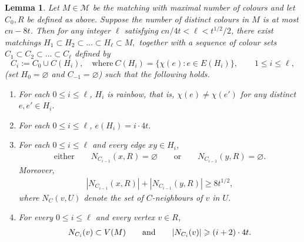 \documentclass[11pt,reqno]{amsart}
\newtheorem{lemma}[theorem]{Lemma}
\theoremstyle{definition}
\theoremstyle{remark}
\newcommand\cM{\mathcal{M}}
\renewcommand\leq{\leqslant}
\renewcommand\geq{\geqslant}
\renewcommand\le{\leqslant}
\renewcommand\ge{\geqslant}
\begin{document}
\begin{lemma}\label{lem:matchingkey}
Let $M \in \cM$ be the matching with maximal number of colours and let $C_0, R$ be defined as above. Suppose the number of distinct colours in $M$ is at most $cn - 8t$. Then for any integer $\ell$ satisfying $cn/4t < \ell < t^{1/2}/2$, there exist matchings
$H_1\subset H_2\subset...\subset H_\ell \subset M,$
together with a sequence of colour sets $C_1\subset C_2\subset...\subset C_\ell$ defined by
\[
C_i := C_0 \cup C(H_i), \quad \text{where}\ C(H_i)=\{\chi(e) : e \in E(H_i)\}, \qquad 1 \le i \le \ell,
\]
(set $H_0=\varnothing$ and $C_{-1}=\varnothing$) such that the following holds. 
\begin{enumerate}
\item[(i)] For each $0 \leq i\leq \ell$, $H_i$ is rainbow, that is,
$\chi(e)\neq\chi(e')$
for any distinct $e,e'\in H_i$.

\item[(ii)] For each $0 \le i \le \ell$, $e(H_i) = i\cdot 4t.$
 
\item[(iii)]  For each $0 \le i \le \ell$ and  every edge $xy\in H_i$, 
\begin{align}\label{eq:onesideempty}
\text{either}\qquad N_{C_{i-1}}(x,R)=\varnothing\qquad\text{or}\qquad N_{C_{i-1}}(y,R)=\varnothing.     
\end{align}
Moreover, 
\begin{align}\label{eq:degreesum}
|N_{C_{i-1}}(x, R)| + |N_{C_{i-1}}(y,  R)|\geq 8t^{1/2},
\end{align}
where $N_{C}(v, U)$ denote the set of $C$-neighbours of $v$ in $U$.


\item[(iv)] For every $0 \le i \le \ell$ and every vertex $v \in R$, 
\begin{align}\label{eq:|N_{C_i}(v, V(M_i))| ge s}
N_{C_i}(v) \subset V(M)\qquad\text{and}\qquad |N_{C_i}(v)| \ge (i+2)\cdot 4t. 
\end{align}
\end{enumerate}
\end{lemma}
\end{document}
